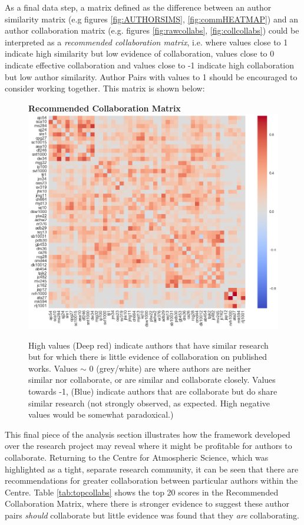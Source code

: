 As a final data step, a matrix defined as the difference between an author similarity matrix (e.g figures \ref{fig:AUTHORSIMS}, \ref{fig:commHEATMAP}) and an author collaboration matrix (e.g. figures \ref{fig:rawcollabs}, \ref{fig:collcollabs}) could be interpreted as a \emph{recommended collaboration matrix}, i.e. where values close to 1 indicate high similarity but low evidence of collaboration, values close to 0 indicate effective collaboration and values close to -1 indicate high collaboration but low author similarity. Author Pairs with values to 1 should be encouraged to consider working together. This matrix is shown below:
\begin{center}
\begin{figure}[H]
  \centering
  \textbf{Recommended Collaboration Matrix}
    \includegraphics[width=\textwidth]{Analysis/Recommending_Mat.png}
    \caption[Recommended Collaboration Matrix]{High values (Deep red) indicate authors that have similar research but for which there is little evidence of collaboration on published works. Values $\sim$ 0 (grey/white) are where authors are neither similar nor collaborate, or are similar and collaborate closely. Values towards -1, (Blue) indicate authors that are collaborate but do share similar research (not strongly observed, as expected. High negative values would be somewhat paradoxical.) }
    \label{fig:RECOMM_MAT}

\end{figure} 
\end{center}
This final piece of the analysis section illustrates how the framework developed over the research project may reveal where it might be profitable for authors to collaborate. Returning to the Centre for Atmospheric Science, which was highlighted as a tight, separate research community, it can be seen that there are recommendations for greater collaboration between particular authors within the Centre. Table \ref{tab:topcollabs} shows the top 20 scores in the Recommended Collaboration Matrix, where there is stronger evidence to suggest these author pairs \emph{should} collaborate but little evidence was found that they \emph{are} collaborating.

